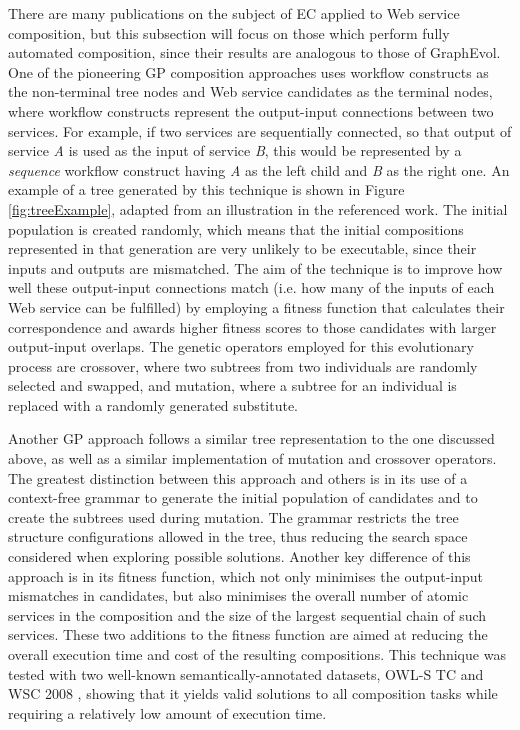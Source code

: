 \documentclass{article}
\begin{document}
There are many publications on the subject of EC applied to Web service composition, but this subsection will focus on those which perform fully automated composition,
since their results are analogous to those of GraphEvol. One of the pioneering GP composition approaches \cite{aversano2006genetic} uses workflow constructs as the non-terminal tree nodes and Web service candidates as the terminal nodes, where workflow constructs represent the output-input connections between
two services. For example, if two services are sequentially connected, so that output of service \textit{A} is used as the input of service \textit{B}, this would be represented
by a \textit{sequence} workflow construct having \textit{A} as the left child and \textit{B} as the right one. 
An example of a tree generated by this technique is shown in Figure \ref{fig:treeExample}, adapted from an illustration in the referenced work. The initial population is created randomly, which means that the initial compositions represented in that generation are very unlikely to be executable, since their inputs and outputs are mismatched.
The aim of the technique is to improve how well these output-input connections match (i.e. how many of the inputs of each Web service can be fulfilled) by employing a fitness function that calculates their correspondence and awards higher fitness scores to those candidates with larger output-input overlaps. The genetic operators employed for this evolutionary process are crossover, where two subtrees from two individuals are randomly selected and swapped, and mutation, where a subtree for an individual is replaced with a randomly generated substitute.

Another GP approach \cite{rodriguez2010composition} follows a similar tree representation to the one discussed above, as well as a similar implementation of mutation and crossover operators. The greatest distinction between this approach and others is in its use of a context-free grammar to generate the initial population of candidates and to create the subtrees used during mutation. The grammar restricts the tree structure configurations allowed in the tree, thus reducing the search space considered when exploring possible solutions. Another key difference of this approach is in its fitness function, which not only minimises the output-input mismatches in candidates, but also minimises the overall number of atomic services in the composition and the size of the largest sequential chain of such services. These two additions to the fitness function are aimed at reducing the overall execution time and cost of the resulting compositions. This technique was tested with two well-known semantically-annotated datasets, OWL-S TC \cite{kuster2008opossum} and WSC 2008 \cite{bansal2008wsc}, showing that it yields valid solutions to all composition tasks while requiring a relatively low amount of execution time.
\end{document}
